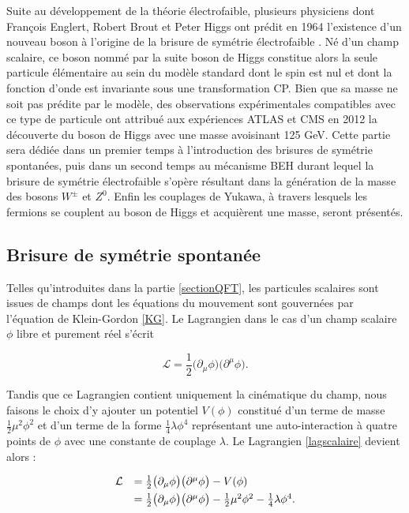         Suite au développement de la théorie électrofaible, plusieurs physiciens dont François Englert, Robert Brout et Peter Higgs ont prédit en 1964 l'existence d'un nouveau boson à l'origine de la brisure de symétrie électrofaible \cite{BE,H}. Né d'un champ scalaire, ce boson nommé par la suite boson de Higgs constitue alors la seule particule élémentaire au sein du modèle standard dont le spin est nul et dont la fonction d'onde est invariante sous une transformation CP. Bien que sa masse ne soit pas prédite par le modèle, des observations expérimentales compatibles avec ce type de particule ont attribué aux expériences ATLAS et CMS en 2012 la découverte du boson de Higgs avec une masse avoisinant 125 GeV. Cette partie sera dédiée dans un premier temps à l'introduction des brisures de symétrie spontanées, puis dans un second temps au mécanisme BEH durant lequel la brisure de symétrie électrofaible s'opère résultant dans la génération de la masse des bosons $W^{\pm}$ et $Z^0$. Enfin les couplages de Yukawa, à travers lesquels les fermions se couplent au boson de Higgs et acquièrent une masse, seront présentés.

        \subsection{Brisure de symétrie spontanée}

        Telles qu'introduites dans la partie \ref{sectionQFT}, les particules scalaires sont issues de champs dont les équations du mouvement sont gouvernées par l'équation de Klein-Gordon \ref{KG}. Le Lagrangien dans le cas d'un champ scalaire $\phi$ libre et purement réel s'écrit

        \begin{equation}
            \mathcal{L}=\frac{1}{2}\bigl(\partial_{\mu}\phi\bigr)\bigl(\partial^{\mu}\phi\bigr).
        \label{lagscalaire}
        \end{equation}

        Tandis que ce Lagrangien contient uniquement la cinématique du champ, nous faisons le choix d'y ajouter un potentiel $V(\phi)$ constitué d'un terme de masse $\frac{1}{2}\mu^2\phi^2$ et d'un terme de la forme $\frac{1}{4}\lambda\phi^4$ représentant une auto-interaction à quatre points de $\phi$ avec une constante de couplage $\lambda$. Le Lagrangien \ref{lagscalaire} devient alors :

        \begin{equation}
        \begin{array}{ll}
            \mathcal{L}&=\frac{1}{2}\bigl(\partial_{\mu}\phi\bigr)\bigl(\partial^{\mu}\phi\bigr)-V(\phi) \vspace{4pt}\\
                       &=\frac{1}{2}\bigl(\partial_{\mu}\phi\bigr)\bigl(\partial^{\mu}\phi\bigr)-\frac{1}{2}\mu^2\phi^2-\frac{1}{4}\lambda\phi^4.
        \end{array}
        \label{laghiggs}
        \end{equation}


